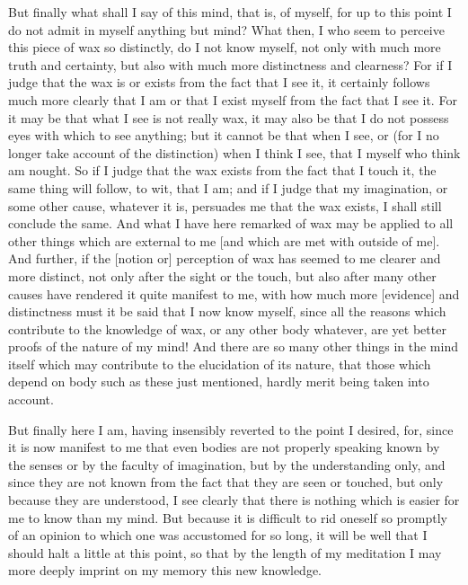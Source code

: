 But finally what shall I say of this mind, that is, of myself, for up
to this point I do not admit in myself anything but mind? What then, I
who seem to perceive this piece of wax so distinctly, do I not know
myself, not only with much more truth and certainty, but also with
much more distinctness and clearness? For if I judge that the wax is
or exists from the fact that I see it, it certainly follows much more
clearly that I am or that I exist myself from the fact that I see it.
For it may be that what I see is not really wax, it may also be that I
do not possess eyes with which to see anything; but it cannot be that
when I see, or (for I no longer take account of the distinction) when
I think I see, that I myself who think am nought. So if I judge that
the wax exists from the fact that I touch it, the same thing will
follow, to wit, that I am; and if I judge that my imagination, or some
other cause, whatever it is, persuades me that the wax exists, I shall
still conclude the same. And what I have here remarked of wax may be
applied to all other things which are external to me [and which are
met with outside of me]. And further, if the [notion or] perception of
wax has seemed to me clearer and more distinct, not only after the
sight or the touch, but also after many other causes have rendered it
quite manifest to me, with how much more [evidence] and distinctness
 must it be said that I now know myself, since all the
reasons which contribute to the knowledge of wax, or any other body
whatever, are yet better proofs of the nature of my mind! And there
are so many other things in the mind itself which may contribute to
the elucidation of its nature, that those which depend on body such as
these just mentioned, hardly merit being taken into account.

But finally here I am, having insensibly reverted to the point I
desired, for, since it is now manifest to me that even bodies are not
properly speaking known by the senses or by the faculty of
imagination, but by the understanding only, and since they are not
known from the fact that they are seen or touched, but only because
they are understood, I see clearly that there is nothing which is
easier for me to know than my mind. But because it is difficult to rid
oneself so promptly of an opinion to which one was accustomed for so
long, it will be well that I should halt a little at this point, so
that by the length of my meditation I may more deeply imprint on my
memory this new knowledge.

